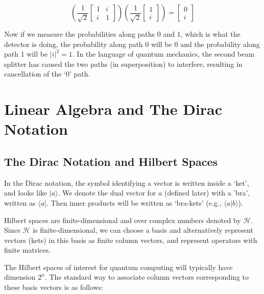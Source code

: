 \documentclass[12pt]{article}
\begin{document}
\begin{equation}
    \left(\frac{1}{\sqrt{2}}
    \begin{bmatrix} 
    1 & i \\ 
    i & 1 
    \end{bmatrix}\right)
    \left(\frac{1}{\sqrt{2}}
    \begin{bmatrix} 
    1 \\ i 
    \end{bmatrix}\right) = 
    \begin{bmatrix}
        0 \\
        i
    \end{bmatrix}
\end{equation}

Now if we measure the probabilities along paths 0 and 1, which is what the detector is doing, the probability along path 0 will be 0 and the probability along path 1 will be \(|i|^2 = 1\). In the language of quantum mechanics, the second beam splitter has caused the two paths (in superposition) to interfere, resulting in cancellation of the ‘0’ path.

\clearpage

\section{Linear Algebra and The Dirac Notation}

\subsection{The Dirac Notation and Hilbert Spaces}

\hspace*{0.5cm} In the Dirac notation, the symbol identifying a vector is written inside a ‘ket’, and looks like \( |a\rangle \). We denote the dual vector for \( a \) (defined later) with a 'bra’, written as \( \langle a| \). Then inner products will be written as ‘bra-kets’ (e.g., \( \langle a | b \rangle \)). 

Hilbert spaces are finite-dimensional and over complex numbers denoted by \(\mathcal{H}\). Since \(\mathcal{H}\) is finite-dimensional, we can choose a basis and alternatively represent vectors (kets) in this basis as finite column vectors, and represent operators with
finite matrices. 

The Hilbert spaces of interest for quantum computing will typically have dimension \(2^n\). The standard way to associate column vectors corresponding to these basis vectors is as follows:
\end{document}
